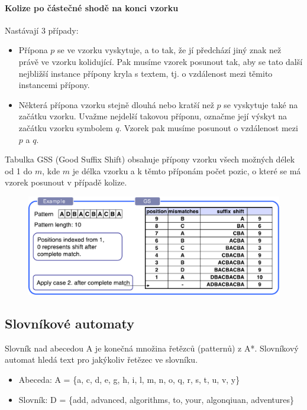 \paragraph{Kolize po částečné shodě na konci vzorku} Nastávají 3 případy:

\begin{itemize}
\item Přípona $p$ se ve vzorku vyskytuje, a to tak, že jí předchází jiný znak než právě ve vzorku kolidující. Pak musíme vzorek posunout tak, aby se tato další nejbližší instance přípony kryla s textem, tj. o vzdálenost mezi těmito instancemi přípony.
\item Některá přípona vzorku stejně dlouhá nebo kratší než $p$ se vyskytuje také na začátku vzorku. Uvažme nejdelší takovou příponu, označme její výskyt na začátku vzorku symbolem $q$. Vzorek pak musíme posunout o vzdálenost mezi $p$ a $q$.
\end{itemize}

Tabulka GSS (Good Suffix Shift) obsahuje přípony vzorku všech možných délek od 1 do $m$, kde $m$ je délka vzorku a k těmto příponám počet pozic, o které se má vzorek posunout v případě kolize.

\begin{figure}[h]
    \begin{center}
        \includegraphics[width=120mm]{04/images/gss}
    \end{center}
\end{figure}


\subsection{Slovníkové automaty}
Slovník nad abecedou A je konečná množina řetězců (patternů) z A*. Slovníkový automat hledá text pro jakýkoliv řetězec ve slovníku.

\begin{itemize}
\item Abeceda: A = \{a, c, d, e, g, h, i, l, m, n, o, q, r, s, t, u, v, y\}
\item Slovník: D = \{add, advanced, algorithms, to, your, algonqiuan, adventures\}
\end{itemize}

